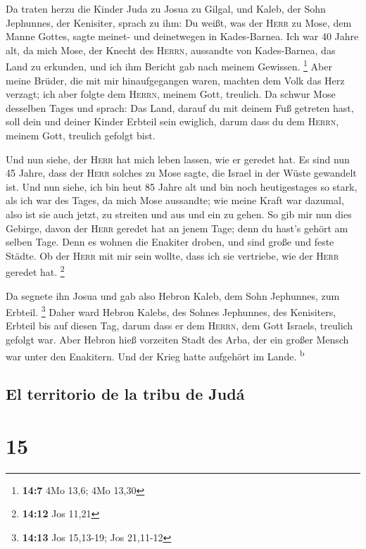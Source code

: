  Da traten herzu die Kinder Juda zu Josua zu Gilgal, und
Kaleb, der Sohn Jephunnes, der Kenisiter, sprach zu ihm: Du weißt, was
der \textsc{Herr} zu Mose, dem Manne Gottes, sagte meinet- und
deinetwegen in Kades-Barnea.  Ich war 40 Jahre alt, da
mich Mose, der Knecht des \textsc{Herrn}, aussandte von Kades-Barnea,
das Land zu erkunden, und ich ihm Bericht gab nach meinem Gewissen.
\footnote{\textbf{14:7} 4Mo 13,6; 4Mo 13,30}  Aber meine
Brüder, die mit mir hinaufgegangen waren, machten dem Volk das Herz
verzagt; ich aber folgte dem \textsc{Herrn}, meinem Gott, treulich.
 Da schwur Mose desselben Tages und sprach: Das Land,
darauf du mit deinem Fuß getreten hast, soll dein und deiner Kinder
Erbteil sein ewiglich, darum dass du dem \textsc{Herrn}, meinem Gott,
treulich gefolgt bist.

 Und nun siehe, der \textsc{Herr} hat mich leben lassen,
wie er geredet hat. Es sind nun 45 Jahre, dass der \textsc{Herr} solches
zu Mose sagte, die Israel in der Wüste gewandelt ist. Und nun siehe, ich
bin heut 85 Jahre alt  und bin noch heutigestages so
stark, als ich war des Tages, da mich Mose aussandte; wie meine Kraft
war dazumal, also ist sie auch jetzt, zu streiten und aus und ein zu
gehen.  So gib mir nun dies Gebirge, davon der
\textsc{Herr} geredet hat an jenem Tage; denn du hast's gehört am selben
Tage. Denn es wohnen die Enakiter droben, und sind große und feste
Städte. Ob der \textsc{Herr} mit mir sein wollte, dass ich sie
vertriebe, wie der \textsc{Herr} geredet hat. \footnote{\textbf{14:12}
  Jos 11,21}

 Da segnete ihn Josua und gab also Hebron Kaleb, dem Sohn
Jephunnes, zum Erbteil. \footnote{\textbf{14:13} Jos 15,13-19; Jos
  21,11-12}  Daher ward Hebron Kalebs, des Sohnes
Jephunnes, des Kenisiters, Erbteil bis auf diesen Tag, darum dass er dem
\textsc{Herrn}, dem Gott Israels, treulich gefolgt war. 
Aber Hebron hieß vorzeiten Stadt des Arba, der ein großer Mensch war
unter den Enakitern. Und der Krieg hatte aufgehört im Lande.
\textsuperscript{b}

\hypertarget{el-territorio-de-la-tribu-de-juduxe1}{%
\subsection{El territorio de la tribu de
Judá}\label{el-territorio-de-la-tribu-de-juduxe1}}

\hypertarget{section-14}{%
\section{15}\label{section-14}}

